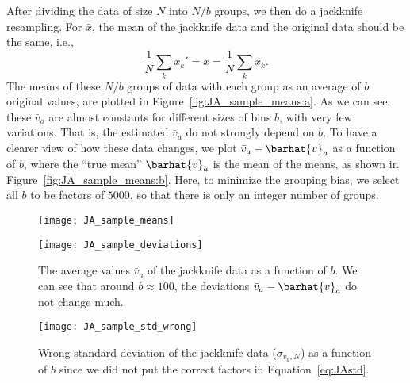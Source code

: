 After dividing the data of size \(N\) into \(N/b\) groups, we then do a jackknife resampling.
For \(\bar{x}\), the mean of the jackknife data and the original data should be the
same, i.e.,
%
\begin{equation}
    \frac{ 1 }{ N } \sum_k x_k' = \bar{x} = \frac{ 1 }{ N } \sum_k x_k.
\end{equation}
%
The means of these \(N/b\) groups of data with each group as an average of \(b\) original
values, are plotted in Figure~\ref{fig:JA_sample_means:a}.
As we can see, these \(\bar{v}_a\) are almost constants for different sizes of bins \(b\),
with very few variations.
That is, the estimated \(\bar{v}_a\) do not strongly depend on \(b\).
To have a clearer view of how these data changes, we plot \(\bar{v}_a - \barhat{v}_a\)
as a function of \(b\), where the ``true mean'' \(\barhat{v}_a\) is the mean of
the means, as shown in Figure~\ref{fig:JA_sample_means:b}.
Here, to minimize the grouping bias, we select all \(b\) to be factors of \(5000\),
so that there is only an integer number of groups.

\begin{figure}
    \centering
    \begin{minipage}[t]{0.8\linewidth}
        \centering
        \texttt{[image: JA\_sample\_means]}
        \label{fig:JA_sample_means:a}
    \end{minipage}
    \hfill
    \begin{minipage}[t]{0.8\linewidth}
        \centering
        \texttt{[image: JA\_sample\_deviations]}
        \label{fig:JA_sample_means:b}
    \end{minipage}
    \caption{The average values \(\bar{v}_a\) of the jackknife data as a function of \(b\).
        We can see that around \(b \approx 100\), the deviations \(\bar{v}_a - \barhat{v}_a\)
        do not change much.}
    \label{fig:JA_sample_means}
\end{figure}

\begin{figure}
    \centering
    \texttt{[image: JA\_sample\_std\_wrong]}
    \caption{Wrong standard deviation of the jackknife data (\(\sigma_{\bar{v}_a,N}\)) as a
        function of \(b\) since we did not put the correct factors in
        Equation~\eqref{eq:JAstd}.}
    \label{fig:JA_sample_std_wrong}
\end{figure}

